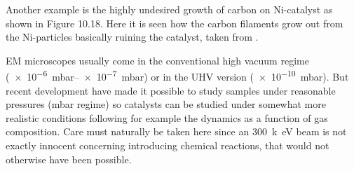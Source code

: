 \vspace*{11cm}


\vspace{1cm} 

Another example is the highly undesired growth of carbon on Ni-catalyst as shown in Figure 10.18. Here it is seen how the carbon filaments grow out from the Ni-particles basically ruining the catalyst, taken from \cite{carbon}.

\vspace*{11cm}


\vspace{1cm} 

EM microscopes usually come in the conventional high vacuum regime (\SIrange{e-6}{e-7}{mbar}) or in the UHV version (\SI{e-10}{mbar}). But  recent development have made it possible to study samples under reasonable pressures (mbar regime) so catalysts can be studied under somewhat more realistic conditions following for example the dynamics as a function of gas composition. Care must naturally be taken here since an \SI{300}{k\electronvolt} beam is not exactly innocent concerning introducing chemical reactions, that would not otherwise have been possible.
\newpage